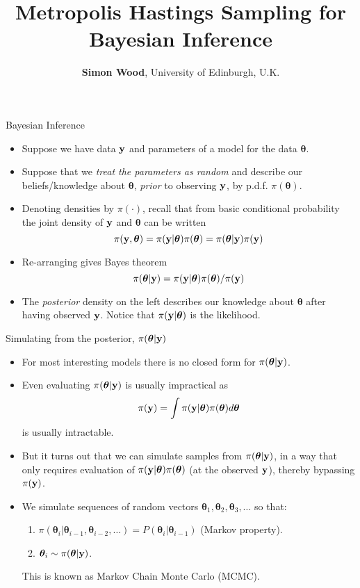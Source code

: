 \documentclass{beamer}
\title{Metropolis Hastings Sampling for Bayesian Inference}
\author{{\bf Simon Wood}, University of Edinburgh, U.K.}
\date{}
\begin{document}
\begin{frame}
\titlepage
\end{frame}

\begin{frame}{Bayesian Inference}
\begin{itemize}
\item Suppose we have data $\bf y$ and parameters of a model for the data $\bm \theta$. 
\item Suppose that we {\em treat the parameters as random} and describe our beliefs/knowledge about $\bm \theta$, {\em prior} to observing $\bf y$, by p.d.f. $\pi ({\bm\theta})$.
\item Denoting densities by $\pi(\cdot)$, recall that from basic conditional probability the joint density of ${\bf y}$ and ${\bm \theta}$ can be written
$$
\pi({\bf y}, {\bm \theta}) = \pi({\bf y} | {\bm \theta})\pi ({\bm \theta}) = \pi( {\bm \theta}|{\bf y})\pi ({\bf y})
$$
\item Re-arranging gives Bayes theorem
$$
\pi( {\bm \theta}|{\bf y}) = \pi({\bf y} | {\bm \theta})\pi ({\bm \theta})/\pi({\bf y})
$$
\item The {\em posterior} density on the left describes our knowledge about $\bm \theta$ after having observed $\bf y$. Notice that $ \pi({\bf y} | {\bm \theta})$ is the likelihood.
\end{itemize}
\end{frame}

\begin{frame}{Simulating from the posterior, $\pi( {\bm \theta}|{\bf y})$ }
\begin{itemize}
\item For most interesting models there is no closed form for $\pi( {\bm \theta}|{\bf y})$.
\item Even evaluating $\pi( {\bm \theta}|{\bf y})$ is usually impractical as 
$$
\pi({\bf y}) = \int \pi({\bf y} | {\bm \theta})\pi ({\bm \theta}) d{\bm \theta}
$$
is usually intractable.
\item But it turns out that we can simulate samples from $\pi( {\bm \theta}|{\bf y})$, in a way that  only requires evaluation of $\pi({\bf y} | {\bm \theta})\pi ({\bm \theta})$ (at the observed $\bf y$), thereby bypassing
$\pi ({\bf y})$.
\item We simulate sequences of random vectors ${\bm \theta}_1, {\bm \theta}_2, {\bm \theta}_3, \ldots $ so that:
\begin{enumerate}
\item $\pi({\bm \theta}_i|{\bm \theta}_{i-1},{\bm \theta}_{i-2},\ldots) = P({\bm \theta}_i|{\bm \theta}_{i-1})$ (Markov property).
\item ${\bm \theta}_i \sim \pi( {\bm \theta}|{\bf y})$.\end{enumerate}
This is known as Markov Chain Monte Carlo (MCMC).

\end{itemize}
\end{frame}
\end{document}
